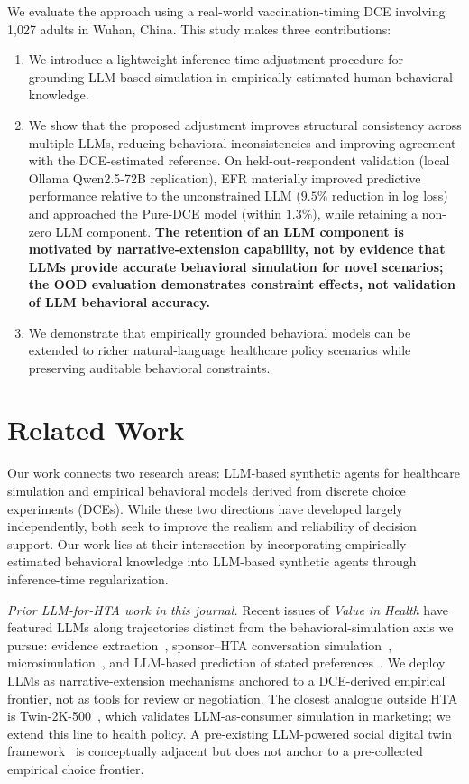 \documentclass[11pt]{article}
\begin{document}
We evaluate the approach using a real-world vaccination-timing DCE involving 1,027 adults in Wuhan, China. This study makes three contributions:

\begin{enumerate}
    \item We introduce a lightweight inference-time adjustment procedure for grounding LLM-based simulation in empirically estimated human behavioral knowledge.

    \item We show that the proposed adjustment improves structural consistency across multiple LLMs, reducing behavioral inconsistencies and improving agreement with the DCE-estimated reference. On held-out-respondent validation (local Ollama Qwen2.5-72B replication), EFR materially improved predictive performance relative to the unconstrained LLM ($9.5\%$ reduction in log loss) and approached the Pure-DCE model (within $1.3\%$), while retaining a non-zero LLM component. \textbf{The retention of an LLM component is motivated by narrative-extension capability, not by evidence that LLMs provide accurate behavioral simulation for novel scenarios; the OOD evaluation demonstrates constraint effects, not validation of LLM behavioral accuracy.}

    \item We demonstrate that empirically grounded behavioral models can be extended to richer natural-language healthcare policy scenarios while preserving auditable behavioral constraints.
\end{enumerate}\section{Related Work}

Our work connects two research areas: LLM-based synthetic agents for healthcare simulation and empirical behavioral models derived from discrete choice experiments (DCEs). While these two directions have developed largely independently, both seek to improve the realism and reliability of decision support. Our work lies at their intersection by incorporating empirically estimated behavioral knowledge into LLM-based synthetic agents through inference-time regularization.

\emph{Prior LLM-for-HTA work in this journal.} Recent issues of \emph{Value in Health} have featured LLMs along trajectories distinct from the behavioral-simulation axis we pursue: evidence extraction~\citep{shree2025stability}, sponsor--HTA conversation simulation~\citep{luo2025sponsor}, microsimulation~\citep{tornberg2025validation}, and LLM-based prediction of stated preferences~\citep{Cheng2026}. We deploy LLMs as narrative-extension mechanisms anchored to a DCE-derived empirical frontier, not as tools for review or negotiation. The closest analogue outside HTA is Twin-2K-500~\citep{toubia2025twin}, which validates LLM-as-consumer simulation in marketing; we extend this line to health policy. A pre-existing LLM-powered social digital twin framework~\citep{koaik2026social} is conceptually adjacent but does not anchor to a pre-collected empirical choice frontier.
\end{document}
